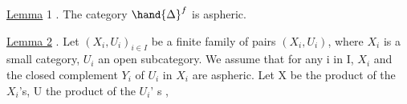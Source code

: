 \uline{Lemma} 1 . The category $\hand{\Delta}^f$ is aspheric.

\uline{Lemma 2} .  Let $(X_i,U_i)_{i\in I}$ be a finite  family of pairs $(X_i,U_i)$,  where
$X_i$ is a small category,  $U_i$ an open subcategory.  We assume that for
any i in I,  $X_i$ and the closed complement $Y_i$ of $U_i$ in $X_i$ are aspheric.
 Let  X be the product of the $X_i$'s,  U the product of the $U_i$' s ,

